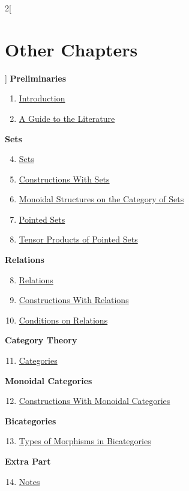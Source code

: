 \begin{multicols}{2}[\section{Other Chapters}]
\noindent
\textbf{Preliminaries}
\begin{enumerate}
\item \hyperref[introduction:section-phantom]{Introduction}
\item \hyperref[a-guide-to-the-literature:section-phantom]{A Guide to the Literature}
\end{enumerate}
\textbf{Sets}
\begin{enumerate}
\setcounter{enumi}{3}
\item \hyperref[sets:section-phantom]{Sets}
\item \hyperref[constructions-with-sets:section-phantom]{Constructions With Sets}
\item \hyperref[monoidal-structures-on-the-category-of-sets:section-phantom]{Monoidal Structures on the Category of Sets}
\item \hyperref[pointed-sets:section-phantom]{Pointed Sets}
\item \hyperref[tensor-products-of-pointed-sets:section-phantom]{Tensor Products of Pointed Sets}
\end{enumerate}
\textbf{Relations}
\begin{enumerate}
\setcounter{enumi}{7}
\item \hyperref[relations:section-phantom]{Relations}
\item \hyperref[constructions-with-relations:section-phantom]{Constructions With Relations}
\item \hyperref[conditions-on-relations:section-phantom]{Conditions on Relations}
\end{enumerate}
\textbf{Category Theory}
\begin{enumerate}
\setcounter{enumi}{10}
\item \hyperref[categories:section-phantom]{Categories}
\end{enumerate}
\textbf{Monoidal Categories}
\begin{enumerate}
\setcounter{enumi}{11}
\item \hyperref[constructions-with-monoidal-categories:section-phantom]{Constructions With Monoidal Categories}
\end{enumerate}
\textbf{Bicategories}
\begin{enumerate}
\setcounter{enumi}{12}
\item \hyperref[types-of-morphisms-in-bicategories:section-phantom]{Types of Morphisms in Bicategories}
\end{enumerate}
\textbf{Extra Part}
\begin{enumerate}
\setcounter{enumi}{13}
\item \hyperref[notes:section-phantom]{Notes}
\end{enumerate}
\end{multicols}
